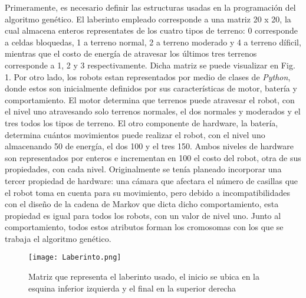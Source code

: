 \documentclass[conference]{IEEEtran}
\begin{document}
Primeramente, es necesario definir las estructuras usadas en la programación del algoritmo genético. El laberinto empleado corresponde a una matriz 20 x 20, la cual almacena enteros representates de los cuatro tipos de terreno: 0 corresponde a celdas bloquedas, 1 a terreno normal, 2 a terreno moderado y 4 a terreno díficil, mientras que el costo de energía de atravesar los últimos tres terrenos corresponde a 1, 2 y 3 respectivamente. Dicha matriz se puede visualizar en Fig. 1. Por otro lado, los robots estan representados por medio de clases de \textit{Python}, donde estos son inicialmente definidos por sus características de motor, batería y comportamiento. El motor determina que terrenos puede atravesar el robot, con el nivel uno atravesando solo terrenos normales, el dos normales y moderados y el tres todos los tipos de terreno. El otro componente de hardware, la batería, determina cuántos movimientos puede realizar el robot, con el nivel uno almacenando 50 de energía, el dos 100 y el tres 150. Ambos niveles de hardware son representados por enteros e incrementan en 100 el costo del robot, otra de sus propiedades, con cada nivel. Originalmente se tenía planeado incorporar una tercer propiedad de hardware: una cámara que afectara el número de casillas que el robot toma en cuenta para su movimiento, pero debido a incompatibilidades con el diseño de la cadena de Markov que dicta dicho comportamiento, esta propiedad es igual para todos los robots, con un valor de nivel uno. Junto al comportamiento, todos estos atributos forman los cromosomas con los que se trabaja el algoritmo genético.

\begin{figure}[htbp]
\centerline{\texttt{[image: Laberinto.png]}}
\caption{Matriz que representa el laberinto usado, el inicio se ubica en la esquina inferior izquierda y el final en la superior derecha}
\label{Imagen de referencia}
\end{figure}
\end{document}
